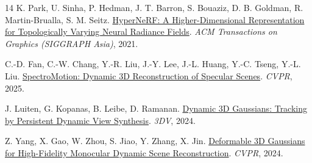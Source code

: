 \documentclass[a4paper]{report}
\begin{document}
\begin{thebibliography}{14}
K. Park, U. Sinha, P. Hedman, J. T. Barron, S. Bouaziz, D. B. Goldman, R. Martin-Brualla, S. M. Seitz.
\href{https://arxiv.org/pdf/2106.13228}{HyperNeRF: A Higher-Dimensional Representation for Topologically Varying Neural Radiance Fields}.
\textit{ACM Transactions on Graphics (SIGGRAPH Asia)}, 2021.

C.-D. Fan, C.-W. Chang, Y.-R. Liu, J.-Y. Lee, J.-L. Huang, Y.-C. Tseng, Y.-L. Liu.
\href{https://arxiv.org/pdf/2410.17249}{SpectroMotion: Dynamic 3D Reconstruction of Specular Scenes}.
\textit{CVPR}, 2025.

J. Luiten, G. Kopanas, B. Leibe, D. Ramanan.
\href{https://arxiv.org/pdf/2308.09713}{Dynamic 3D Gaussians: Tracking by Persistent Dynamic View Synthesis}.
\textit{3DV}, 2024.

Z. Yang, X. Gao, W. Zhou, S. Jiao, Y. Zhang, X. Jin.
\href{https://arxiv.org/pdf/2309.13101}{Deformable 3D Gaussians for High-Fidelity Monocular Dynamic Scene Reconstruction}.
\textit{CVPR}, 2024.

\end{thebibliography}
\end{document}
